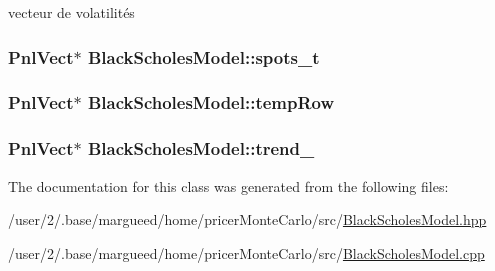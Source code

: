 vecteur de volatilités 

\hypertarget{classBlackScholesModel_a18801c05f4b88b9cbf39fb48bd8beed4}{
\subsubsection[{spots\-\_\-t}]{\setlength{\rightskip}{0pt plus 5cm}Pnl\-Vect$\ast$ Black\-Scholes\-Model\-::spots\-\_\-t\hspace{0.3cm}{\ttfamily [private]}}}\label{classBlackScholesModel_a18801c05f4b88b9cbf39fb48bd8beed4}
\hypertarget{classBlackScholesModel_a28428fd6090bc1062d0ec7612feeaac0}{
\subsubsection[{temp\-Row}]{\setlength{\rightskip}{0pt plus 5cm}Pnl\-Vect$\ast$ Black\-Scholes\-Model\-::temp\-Row\hspace{0.3cm}{\ttfamily [private]}}}\label{classBlackScholesModel_a28428fd6090bc1062d0ec7612feeaac0}
\hypertarget{classBlackScholesModel_af92b535c61f17e7a16af56952739302f}{
\subsubsection[{trend\-\_\-}]{\setlength{\rightskip}{0pt plus 5cm}Pnl\-Vect$\ast$ Black\-Scholes\-Model\-::trend\-\_\-\hspace{0.3cm}{\ttfamily [protected]}}}\label{classBlackScholesModel_af92b535c61f17e7a16af56952739302f}


The documentation for this class was generated from the following files\-:\begin{DoxyCompactItemize}
\item 
/user/2/.\-base/margueed/home/pricer\-Monte\-Carlo/src/\hyperlink{BlackScholesModel_8hpp}{Black\-Scholes\-Model.\-hpp}\item 
/user/2/.\-base/margueed/home/pricer\-Monte\-Carlo/src/\hyperlink{BlackScholesModel_8cpp}{Black\-Scholes\-Model.\-cpp}\end{DoxyCompactItemize}
